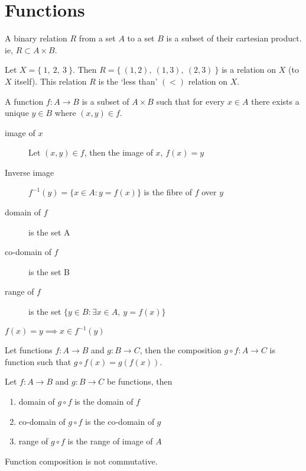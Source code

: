 \section{Functions}
	\begin{definition}
		A binary relation $R$ from a set $A$ to a set $B$ is a subset of their cartesian product. ie, $R \subset A \times B$.
	\end{definition}
	\begin{remark}
		Let $X = \{\ 1,\ 2,\ 3\ \}$. Then $R = \{\ (1,2),\ (1,3),\ (2,3)\ \}$ is a relation on $X$ (to $X$ itself). This relation $R$ is the `less than' $(<)$ relation on $X$.
	\end{remark}
	\begin{definition}
		A function $ f : A \to B$ is a subset of $A \times B$ such that for every $x \in A$ there exists a unique $y \in B$ where $(x,y) \in f$.
	\end{definition}
	\begin{description}
		\item[image of $x$] Let $(x,y) \in f$, then the image of $x$, $ f(x) = y$
		\item[Inverse image] $f^{-1}(y) = \{ x \in A : y = f(x) \}$ is the fibre of $f$ over $y$\cite{gallian}
		\item[domain of $f$] is the set A 
		\item[co-domain of $f$] is the set B
		\item[range of $f$] is the set $\{ y\in B : \exists x \in A,\ y = f(x) \}$
	\end{description}
	\begin{remark}
		$f(x) = y \implies x \in f^{-1}(y)$
	\end{remark}
	\begin{definition}
		Let functions $f : A \to B$ and $g : B \to C$, then the composition $g \circ f : A \to C$ is function such that $g \circ f (x) = g(f(x))$.
	\end{definition}
	\begin{theorem} Let $f : A \to B$ and $g : B \to C$ be functions, then
		\begin{enumerate}
			\item domain of $g \circ f$ is the domain of $f$
			\item co-domain of $g \circ f$ is the co-domain of $g$
			\item range of $g \circ f$ is the range of image of $A$ 
		\end{enumerate}
	\end{theorem}
	\begin{remark}
		Function composition is not commutative.
	\end{remark}
